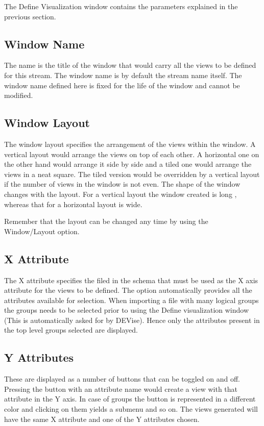 The Define Visualization window contains the parameters explained in the previous section.

\subsection{Window Name}

The name is the title of the window that would carry all the views to be defined for this stream. The window name is by default the stream name itself. The window name defined here is fixed for the life of the window and cannot be modified.

\subsection{Window Layout}

The window layout specifies the arrangement of the views within the window. A vertical layout would arrange the views on top of each other. A horizontal one on the other hand would arrange it side by side and a tiled one would arrange the views in a neat square. The tiled version would be overridden by a vertical layout if the number of views in the window is not even. The shape of the window changes with the layout. For a vertical layout the window created is long , whereas that for a horizontal layout is wide.

Remember that the layout can be changed any time by using the Window/Layout option.

\subsection{X Attribute}

The X attribute specifies the filed in the schema that must be used as the X axis attribute for the views to be defined. The option automatically provides all the attributes available for selection. When importing a file with many logical groups the groups needs to be selected prior to using the Define visualization window (This is automatically asked for by DEVise). Hence only the attributes present  in the top level groups selected are displayed.

\subsection{Y Attributes}

These are displayed as a number of buttons that can be toggled on and  off. Pressing the button with an attribute name would create a view with that attribute in the Y axis. In case of groups the button is represented in a different color and clicking on them yields a submenu and so on. The views generated will have the same  X attribute and one of the Y attributes chosen.

